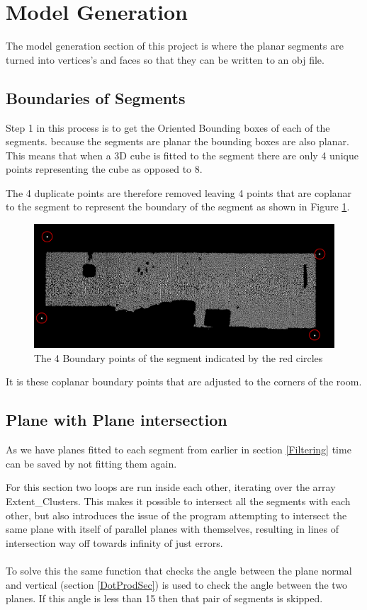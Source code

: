 	\newpage
	\section{Model Generation}
		The model generation section of this project is where the planar segments are turned into vertices's and faces so that they can be written to an obj file.
		
		\subsection{Boundaries of Segments}
		\label{boundaries}
			Step 1 in this process is to get the Oriented Bounding boxes of each of the segments. because the segments are planar the bounding boxes are also planar. This means that when a 3D cube is fitted to the segment there are only 4 unique points representing the cube as opposed to 8.
			
			The 4 duplicate points are therefore removed leaving 4 points that are coplanar to the segment to represent the boundary of the segment as shown in Figure \ref{fig:BOundingBox}.
		
			\begin{figure}[H]
				\centering
				\includegraphics[width=1\linewidth]{"Includes/images/Bounding Box/BOunding Box"}
				\caption{The 4 Boundary points of the segment indicated by the red circles}
				\label{fig:BOundingBox}
			\end{figure}
			It is these coplanar boundary points that are adjusted to the corners of the room.
			
		\subsection{Plane with Plane intersection}
		\label{planeInterResults}
			As we have planes fitted to each segment from earlier in section \ref{Filtering} time can be saved by not fitting them again.
			
			For this section two loops are run inside each other, iterating over the array Extent\_Clusters. This makes it possible to intersect all the segments with each other, but also introduces the issue of the program attempting to intersect the same plane with itself of parallel planes with themselves, resulting in lines of intersection way off towards infinity of just errors.\\
			\\
			To solve this the same function that checks the angle between the plane normal and vertical (section \ref{DotProdSec}) is used to check the angle between the two planes. If this angle is less than 15\textdegree\: then that pair of segments is skipped.
			
